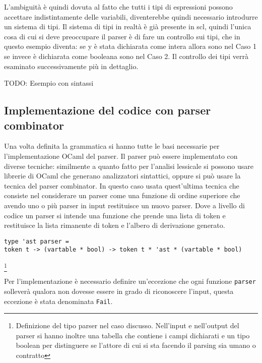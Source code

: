 \documentclass[]{article}
\begin{document}
L'ambiguità è quindi dovuta al fatto che tutti i tipi di espressioni
possono accettare indistintamente delle variabili, diventerebbe quindi
necessario introdurre un sistema di tipi. Il sistema di tipi in realtà è
già presente in scl, quindi l'unica cosa di cui si deve preoccupare il
parser è di fare un controllo sui tipi, che in questo esempio diventa:
se y è stata dichiarata come intera allora sono nel Caso 1 se invece è
dichiarata come booleana sono nel Caso 2. Il controllo dei tipi verrà
esaminato successivamente più in dettaglio.

TODO: Esempio con sintassi

\hypertarget{implementazione-del-codice-con-parser-combinator}{%
\subsection{Implementazione del codice con parser
combinator}\label{implementazione-del-codice-con-parser-combinator}}

Una volta definita la grammatica si hanno tutte le basi necessarie per
l'implementazione OCaml del parser. Il parser può essere implementato
con diverse tecniche: similmente a quanto fatto per l'analisi lessicale
si possono usare librerie di OCaml che generano analizzatori sintattici,
oppure si può usare la tecnica del parser combinator. In questo caso
usata quest'ultima tecnica che consiste nel considerare un parser come
una funzione di ordine superiore che avendo uno o più parser in input
restituisce un nuovo parser. Dove a livello di codice un parser si
intende una funzione che prende una lista di token e restituisce la
lista rimanente di token e l'albero di derivazione generato.

\begin{verbatim}
type 'ast parser = 
token t -> (vartable * bool) -> token t * 'ast * (vartable * bool)
\end{verbatim}

\footnote{Definizione del tipo parser nel caso discusso. Nell'input e
  nell'output del parser si hanno inoltre una tabella che contiene i
  campi dichiarati e un tipo boolean per distinguere se l'attore di cui
  si sta facendo il parsing sia umano o contratto}

Per l'implementazione è necessario definire un'eccezione che ogni
funzione \texttt{parser} solleverà qualora non dovesse essere in grado
di riconoscere l'input, questa eccezione è stata denominata
\texttt{Fail}.
\end{document}
